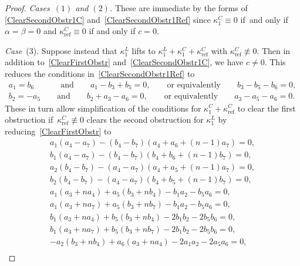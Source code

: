 \documentclass[pdftex]{sigma}
\numberwithin{equation}{section}
\DeclareMathOperator{\refl}{ref}
\begin{document}
\begin{proof}\quad

\textit{Cases~$(1)$ and $(2)$.} These are immediate by the forms of \eqref{ClearSecondObstr1C} and~\eqref{ClearSecondObstr1Ref} since $\kappa^C_1 \equiv 0$ if~and only if $\alpha=\beta=0$ and $\kappa^C_{\refl} \equiv 0$ if and only if $c=0$.

\textit{Case}~(3). Suppose instead that $\kappa^L_1$ lifts to $\kappa^L_1+\kappa^C_1+\kappa^C_{\refl}$
with $\kappa^C_{\refl} \not\equiv 0$. Then
in addition to~\eqref{ClearFirstObstr} and~\eqref{ClearSecondObstr1C},
we have $c \neq 0$. This reduces the conditions in~\eqref{ClearSecondObstr1Ref}
to
\begin{gather}\label{Obstr2kappaCrefc}
a_1=b_6 \phantom{-}\qquad \text{and} \qquad a_1-b_3+b_5=0,\qquad \text{or equivalently}\qquad b_3-b_5-b_6=0,\\
\label{Obstr2kappaCrefd}
b_2=-a_5 \qquad \text{and} \qquad b_2+a_3-a_6=0,\qquad \text{or equivalently}\qquad a_3-a_5-a_6=0.
\end{gather}
These in turn
allow simplification of the conditions for $\kappa^C_1+\kappa^C_{\refl}$ to clear the first obstruction
if~$\kappa^C_{\refl} \not\equiv 0$ clears the second obstruction for $\kappa^L_1$
by reducing~\eqref{ClearFirstObstr} to
\begin{gather}
\label{Obstr1Simplifieda}
a_1(a_4 -a_7) - (b_4-b_7)(a_4+a_6+(n-1)a_7)=0, \\
\label{Obstr1Simplifiedb}
b_1(a_4 - a_7) -(b_4 -b_7)(b_4 + b_6 + (n-1) b_7)=0, \\
\label{Obstr1Simplifiedaprime}
a_2(b_4 -b_7) -(a_4-a_7)(a_4+a_5+(n-1)a_7)=0, \\
\label{Obstr1Simplifiedbprime}
b_2(b_4 -b_7) -(a_4 - a_7)(b_4 + b_5 + (n-1) b_7)=0, \\
\label{Obstr1Simplifiedc}
a_1(a_3 + na_4) + a_5(b_3 + nb_4) -b_1 a_2 - b_5 a_6=0, \\
\label{Obstr1Simplifiedd}
a_1(a_3 + na_7) + a_5(b_3 + nb_7) -b_1 a_2 -b_5 a_6=0, \\
\label{Obstr1Simplifiede}
b_1(a_3 + na_4) + b_5(b_3 + nb_4)- 2b_1 b_2 -2b_5 b_6=0, \\
\label{Obstr1simplifiedf}
b_1(a_3 + na_7) + b_5 (b_3 + nb_7) - 2b_1 b_2 -2b_5 b_6=0, \\
\label{Obstr1Simplifiedg}
-a_2(b_3 + nb_4) + a_6(a_3 + na_4) - 2a_1 a_2 - 2a_5 a_6=0, \\

\end{gather}
\end{proof}
\end{document}
